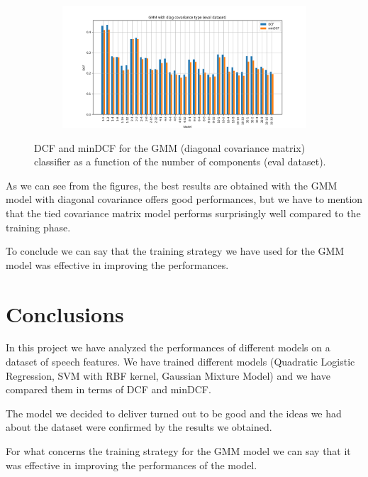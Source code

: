 \documentclass[12pt]{report}
\newcommand{\nnl}{%
    \newline
    \newline
}
\newcommand{\nl}{%
    \newline
    \noindent
}
\begin{document}
\begin{figure}[H]
    \centering
    \begin{subfigure}[t]{0.6\textwidth}
        \includegraphics[width=\textwidth]{./plot/eval/GMM/gmm_diag.png}
    \end{subfigure}
    \caption{DCF and minDCF for the GMM (diagonal covariance matrix) classifier as a function of the number of components (eval dataset).}
    \label{fig:gmm_diag_eval}
\end{figure}

As we can see from the figures, the best results are obtained with the GMM model with diagonal covariance offers good performances, but we have to mention that the tied covariance matrix model performs surprisingly well compared to the training phase.
\nl
To conclude we can say that the training strategy we have used for the GMM model was effective in improving the performances.

\chapter{Conclusions}
In this project we have analyzed the performances of different models on a dataset of speech features. We have trained different models (Quadratic Logistic Regression, SVM with RBF kernel, Gaussian Mixture Model) and we have compared them in terms of DCF and minDCF.
\nnl
The model we decided to deliver turned out to be good and the ideas we had about the dataset were confirmed by the results we obtained.
\nl
For what concerns the training strategy for the GMM model we can say that it was effective in improving the performances of the model.
\end{document}
